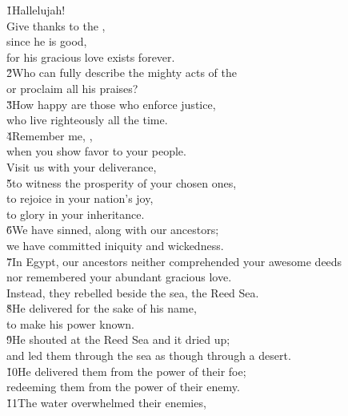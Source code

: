 \begin{poetry}
\poeml \v{1}Hallelujah! \\
\poeml Give thanks to the , \\
\poemll    since he is good, \\
\poemlll       for his gracious love exists forever. \\
\poeml \v{2}Who can fully describe the mighty acts of the  \\
\poemll    or proclaim all his praises? \\
\poeml \v{3}How happy are those who enforce justice, \\
\poemll    who live righteously all the time. \\
\poeml \v{4}Remember me, , \\
\poemll    when you show favor to your people. \\
\poeml Visit us with your deliverance, \\
\poeml \v{5}to witness the prosperity of your chosen ones, \\
\poeml to rejoice in your nation's joy, \\
\poemll    to glory in your inheritance. \\
\poeml \v{6}We have sinned, along with our ancestors; \\
\poemll    we have committed iniquity and wickedness. \\
\poeml \v{7}In Egypt, our ancestors neither comprehended your awesome deeds \\
\poemll    nor remembered your abundant gracious love. \\
\poemlll       Instead, they rebelled beside the sea, the Reed Sea. \\
\poeml \v{8}He delivered for the sake of his name, \\
\poemll    to make his power known. \\
\poeml \v{9}He shouted at the Reed Sea and it dried up; \\
\poemll    and led them through the sea as though through a desert. \\
\poeml \v{10}He delivered them from the power of their foe; \\
\poemll    redeeming them from the power of their enemy. \\
\poeml \v{11}The water overwhelmed their enemies, \\

\end{poetry}
